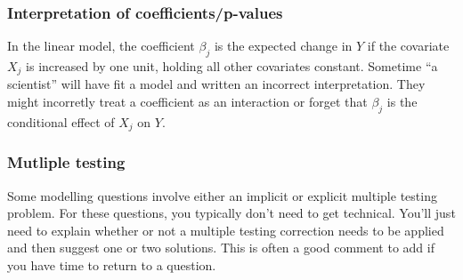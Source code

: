 \subsubsection*{Interpretation of coefficients/p-values}

In the linear model, the coefficient $\beta_j$ is the expected change in $Y$ if the covariate $X_j$ is increased by one unit, holding all other covariates constant. Sometime ``a scientist'' will have fit a model and written an incorrect interpretation. They might incorretly treat a coefficient as an interaction or forget that $\beta_j$ is the conditional effect of $X_j$ on $Y$. 


\subsubsection*{Mutliple testing}

Some modelling questions involve either an implicit or explicit multiple testing problem.  For these questions, you typically don't need to get technical. You'll just need to explain whether or not a multiple testing correction needs to be applied and then suggest one or two solutions. This is often a good comment to add if you have time to return to a question.

